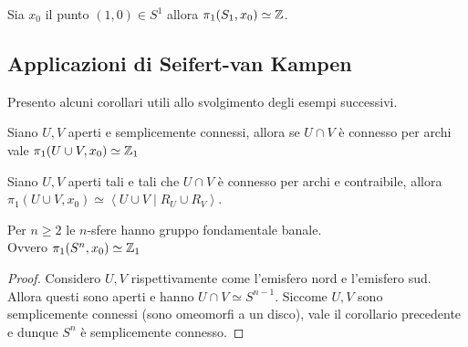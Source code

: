 \begin{theorem}
	Sia $x_0$ il punto $(1,0) \in S^1$ allora $\pi_1(S_1, x_0) \simeq \mathbb{Z}$.
\end{theorem}



\subsection{\textcolor{TopAlg}{\textbf{Applicazioni di Seifert-van Kampen}}}
Presento alcuni corollari utili allo svolgimento degli esempi successivi.

\begin{corollary}
	Siano $U,V$ aperti e semplicemente connessi, allora se $U \cap V$ è connesso per archi vale $\pi_1(U\cup V,x_0) \simeq \mathbb{Z}_1$ 
\end{corollary}

\begin{corollary}
	Siano $U,V$ aperti tali e tali che $U \cap V$ è connesso per archi e contraibile, allora $\pi_1(U \cup V, x_0) \simeq \left\langle U \cup V \mid R_U \cup R_V\right\rangle$.
\end{corollary}


\begin{xca}
	Per $n \ge 2$ le $n$-sfere hanno gruppo fondamentale banale. \\ Ovvero $\pi_1(S^n, x_0) \simeq \mathbb{Z}_1$
\end{xca}
\begin{proof}
	Considero $U,V$ rispettivamente come l'emisfero nord e l'emisfero sud. Allora questi sono aperti e hanno $U \cap V \simeq S^{n-1}$. Siccome $U, V$ sono semplicemente connessi (sono omeomorfi a un disco), vale il corollario precedente e dunque $S^n$ è semplicemente connesso.  
\end{proof}

